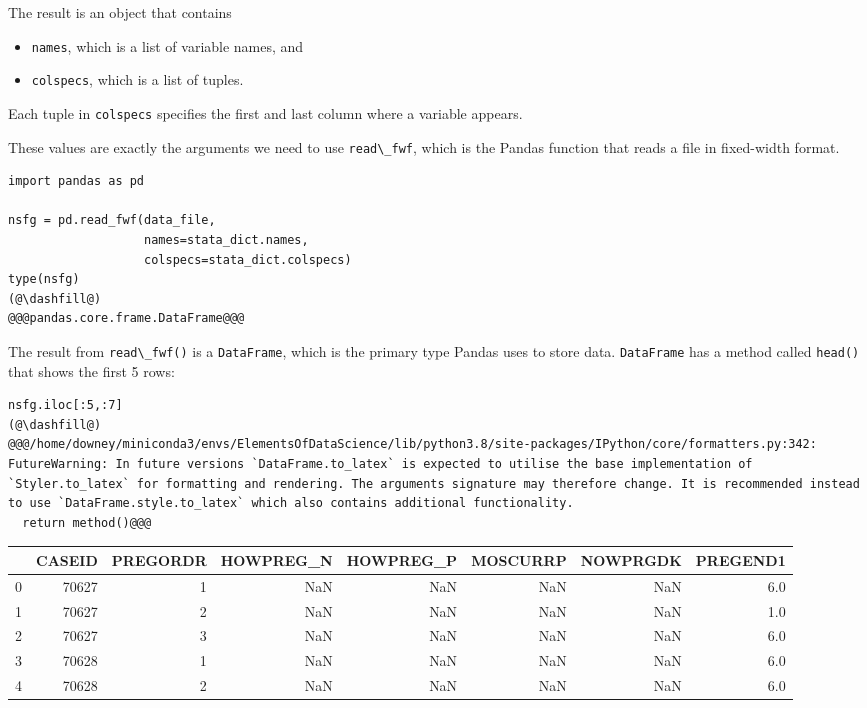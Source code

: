 The result is an object that contains

\begin{itemize}
\item
  \passthrough{\lstinline!names!}, which is a list of variable names,
  and
\item
  \passthrough{\lstinline!colspecs!}, which is a list of tuples.
\end{itemize}

Each tuple in \passthrough{\lstinline!colspecs!} specifies the first and
last column where a variable appears.

These values are exactly the arguments we need to use
\passthrough{\lstinline!read\_fwf!}, which is the Pandas function that
reads a file in fixed-width format.

\begin{lstlisting}[]
import pandas as pd

nsfg = pd.read_fwf(data_file, 
                   names=stata_dict.names, 
                   colspecs=stata_dict.colspecs)
type(nsfg)
(@\dashfill@)
@@@pandas.core.frame.DataFrame@@@
\end{lstlisting}

The result from \passthrough{\lstinline!read\_fwf()!} is a
\passthrough{\lstinline!DataFrame!}, which is the primary type Pandas
uses to store data. \passthrough{\lstinline!DataFrame!} has a method
called \passthrough{\lstinline!head()!} that shows the first 5 rows:

\begin{lstlisting}[]
nsfg.iloc[:5,:7]
(@\dashfill@)
@@@/home/downey/miniconda3/envs/ElementsOfDataScience/lib/python3.8/site-packages/IPython/core/formatters.py:342: FutureWarning: In future versions `DataFrame.to_latex` is expected to utilise the base implementation of `Styler.to_latex` for formatting and rendering. The arguments signature may therefore change. It is recommended instead to use `DataFrame.style.to_latex` which also contains additional functionality.
  return method()@@@
\end{lstlisting}

\begin{tabular}{lrrrrrrr}
\midrule
{} &  CASEID &  PREGORDR &  HOWPREG\_N &  HOWPREG\_P &  MOSCURRP &  NOWPRGDK &  PREGEND1 \\
\midrule
0 &   70627 &         1 &        NaN &        NaN &       NaN &       NaN &       6.0 \\
1 &   70627 &         2 &        NaN &        NaN &       NaN &       NaN &       1.0 \\
2 &   70627 &         3 &        NaN &        NaN &       NaN &       NaN &       6.0 \\
3 &   70628 &         1 &        NaN &        NaN &       NaN &       NaN &       6.0 \\
4 &   70628 &         2 &        NaN &        NaN &       NaN &       NaN &       6.0 \\
\midrule
\end{tabular}

